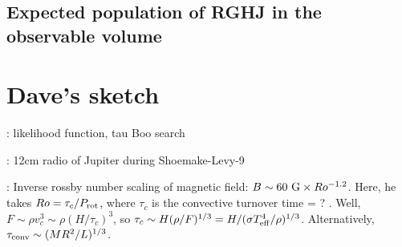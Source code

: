 \documentclass{emulateapj}
\begin{document}
\citet{gorman2013}

\subsection{Expected population of RGHJ in the observable volume}
\label{ss:number}

\newpage


\section{Dave's sketch}

\citep{spiegel2008}

\citep{lecavelier_et_al2013}

\citep{janhunen_et_al2003}

\citep{zarka1992, zarka1998}

\citep{farrell_et_al2004}

\citep{lazio+farrell2007}: likelihood function, tau Boo search

\citep{lecavelier_et_al2009}

\citep{spiegel2012}

\citep{nordhaus+spiegel2013}



\citep{jiang+jin1996}: 12cm radio of Jupiter during Shoemake-Levy-9

\citep{morin2012, morin_et_al2013}

\citep{christensen_et_al2009, christensen2010}

\citep{saar2001}: Inverse rossby number scaling of magnetic field: $B
\sim 60 {\rm~G} \times Ro^{-1.2}$.  Here, he takes $Ro = \tau_c/P_{\rm
  rot}$, where $\tau_c$ is the convective turnover time = ?
\citep{gilliland1986}.  Well, $F \sim \rho v_c^3 \sim \rho
(H/\tau_c)^3$, so $\tau_c \sim H (\rho / F)^{1/3} = H / (\sigma T_{\rm
  eff}^4 / \rho)^{1/3}$.  Alternatively, $\tau_{\rm conv} \sim (M R^2
/ L)^{1/3}$.
\end{document}
